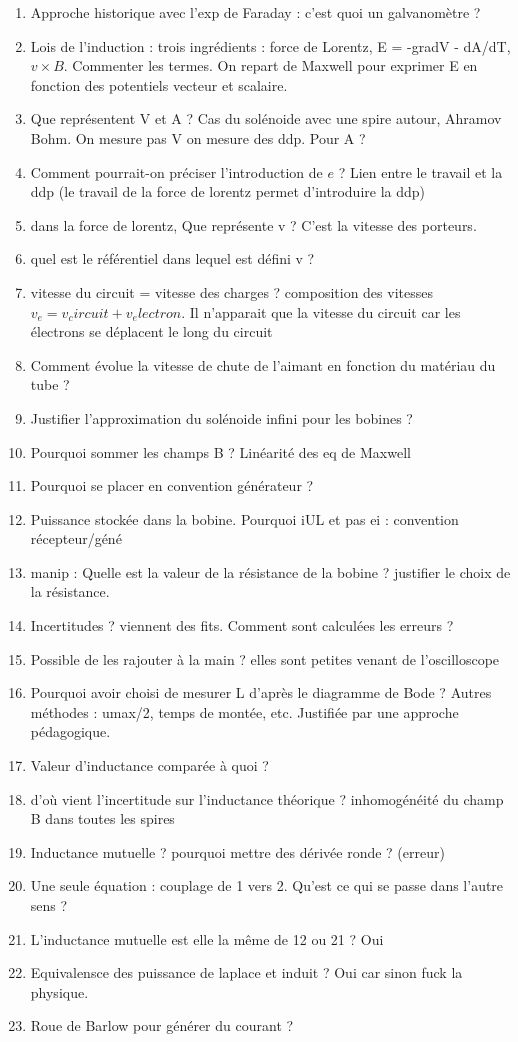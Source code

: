 \begin{enumerate}
\item Approche historique avec l'exp de Faraday : c'est quoi un galvanomètre ?
\item Lois de l'induction : trois ingrédients : force de Lorentz, E = -gradV - dA/dT, $v\times B$. Commenter les termes. On repart de Maxwell pour exprimer E en fonction des potentiels vecteur et scalaire.
\item Que représentent V et A ? Cas du solénoide avec une spire autour, Ahramov Bohm. On mesure pas V on mesure des ddp. Pour A ?
\item Comment pourrait-on préciser l'introduction de $e$ ? Lien entre le travail et la ddp (le travail de la force de lorentz permet d'introduire la ddp)
\item dans la force de lorentz, Que représente v ? C'est la vitesse des porteurs.
\item quel est le référentiel dans lequel est défini v ?
\item vitesse du circuit = vitesse des charges ? composition des vitesses $v_e = v_circuit+v_electron$. Il n'apparait que la vitesse du circuit car les électrons se déplacent le long du circuit
\item Comment évolue la vitesse de chute de l'aimant en fonction du matériau du tube ?
\item Justifier l'approximation du solénoide infini pour les bobines ?
\item Pourquoi sommer les champs B ? Linéarité des eq de Maxwell
\item Pourquoi se placer en convention générateur ?
\item Puissance stockée dans la bobine. Pourquoi iUL et pas ei : convention récepteur/géné
\item manip : Quelle est la valeur de la résistance de la bobine ? justifier le choix de la résistance.
\item Incertitudes ? viennent des fits. Comment sont calculées les erreurs ?
\item Possible de les rajouter à la main ? elles sont petites venant de l'oscilloscope
\item Pourquoi avoir choisi de mesurer L d'après le diagramme de Bode ? Autres méthodes : umax/2, temps de montée, etc. Justifiée par une approche pédagogique.
\item Valeur d'inductance comparée à quoi ?
\item d'où vient l'incertitude sur l'inductance théorique ? inhomogénéité du champ B dans toutes les spires
\item Inductance mutuelle ? pourquoi mettre des dérivée ronde ? (erreur)
\item Une seule équation : couplage de 1 vers 2. Qu'est ce qui se passe dans l'autre sens ?
\item L'inductance mutuelle est elle la même de 12 ou 21 ? Oui
\item Equivalensce des puissance de laplace et induit ? Oui car sinon fuck la physique.
\item Roue de Barlow pour générer du courant ?


\end{enumerate}
